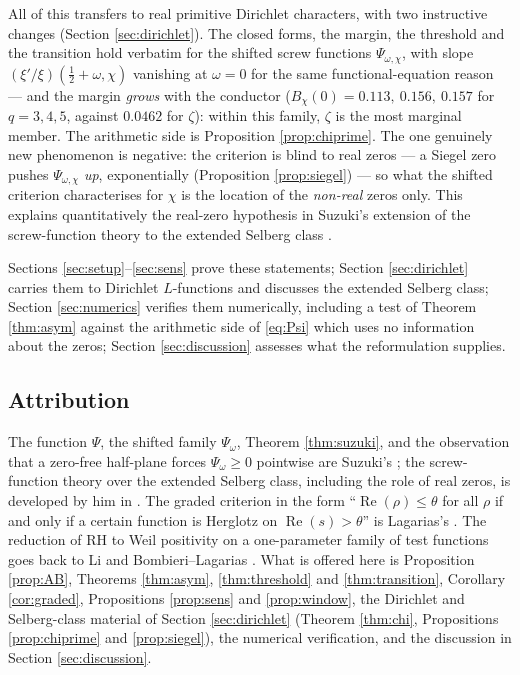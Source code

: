 \documentclass[11pt,reqno]{amsart}
\theoremstyle{plain}
\theoremstyle{definition}
\newcommand{\Rp}{\operatorname{Re}}
\begin{document}
All of this transfers to real primitive Dirichlet characters, with two instructive changes
(Section \ref{sec:dirichlet}). The closed forms, the margin, the threshold and the transition hold
verbatim for the shifted screw functions $\Psi_{\omega,\chi}$, with slope
$(\xi'/\xi)(\tfrac12+\omega,\chi)$ vanishing at $\omega=0$ for the same functional-equation reason
--- and the margin \emph{grows} with the conductor ($B_\chi(0)=0.113,\ 0.156,\ 0.157$ for
$q=3,4,5$, against $0.0462$ for $\zeta$): within this family, $\zeta$ is the most marginal member.
The arithmetic side is Proposition \ref{prop:chiprime}. The one genuinely new phenomenon is
negative: the criterion is blind to real zeros --- a Siegel zero pushes $\Psi_{\omega,\chi}$
\emph{up}, exponentially (Proposition \ref{prop:siegel}) --- so what the shifted criterion
characterises for $\chi$ is the location of the \emph{non-real} zeros only. This explains
quantitatively the real-zero hypothesis in Suzuki's extension of the screw-function theory to the
extended Selberg class \cite[Thm.~1.1]{SuzukiSelberg}.

Sections \ref{sec:setup}--\ref{sec:sens} prove these statements; Section \ref{sec:dirichlet}
carries them to Dirichlet $L$-functions and discusses the extended Selberg class; Section
\ref{sec:numerics} verifies them numerically, including a test of Theorem \ref{thm:asym} against
the arithmetic side of \eqref{eq:Psi} which uses no information about the zeros; Section
\ref{sec:discussion} assesses what the reformulation supplies.

\subsection*{Attribution}
The function $\Psi$, the shifted family $\Psi_\omega$, Theorem \ref{thm:suzuki}, and the observation
that a zero-free half-plane forces $\Psi_\omega\ge0$ pointwise are Suzuki's \cite{Suzuki2023}; the
screw-function theory over the extended Selberg class, including the role of real zeros, is
developed by him in \cite{SuzukiSelberg}. The graded criterion in the form ``$\Rp(\rho)\le\theta$
for all $\rho$ if and only if a certain function is Herglotz on $\Rp(s)>\theta$'' is Lagarias's
\cite[Thm.~1.1]{Lagarias1999}. The reduction of RH to Weil positivity on a one-parameter family of
test functions goes back to Li \cite{Li} and Bombieri--Lagarias \cite{BombieriLagarias}. What is
offered here is Proposition \ref{prop:AB}, Theorems \ref{thm:asym}, \ref{thm:threshold} and
\ref{thm:transition}, Corollary \ref{cor:graded}, Propositions \ref{prop:sens} and
\ref{prop:window}, the Dirichlet and Selberg-class material of Section \ref{sec:dirichlet}
(Theorem \ref{thm:chi}, Propositions \ref{prop:chiprime} and \ref{prop:siegel}), the numerical
verification, and the discussion in Section \ref{sec:discussion}.
\end{document}
